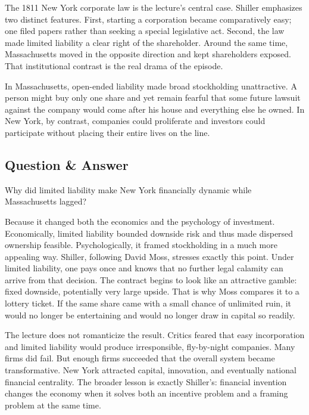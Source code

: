 The 1811 New York corporate law is the lecture's central case. Shiller emphasizes two distinct features. First, starting a corporation became comparatively easy; one filed papers rather than seeking a special legislative act. Second, the law made limited liability a clear right of the shareholder. Around the same time, Massachusetts moved in the opposite direction and kept shareholders exposed. That institutional contrast is the real drama of the episode.

In Massachusetts, open-ended liability made broad stockholding unattractive. A person might buy only one share and yet remain fearful that some future lawsuit against the company would come after his house and everything else he owned. In New York, by contrast, companies could proliferate and investors could participate without placing their entire lives on the line.

\subsection{Question \& Answer}

Why did limited liability make New York financially dynamic while Massachusetts lagged?

Because it changed both the economics and the psychology of investment. Economically, limited liability bounded downside risk and thus made dispersed ownership feasible. Psychologically, it framed stockholding in a much more appealing way. Shiller, following David Moss, stresses exactly this point. Under limited liability, one pays once and knows that no further legal calamity can arrive from that decision. The contract begins to look like an attractive gamble: fixed downside, potentially very large upside. That is why Moss compares it to a lottery ticket. If the same share came with a small chance of unlimited ruin, it would no longer be entertaining and would no longer draw in capital so readily.

The lecture does not romanticize the result. Critics feared that easy incorporation and limited liability would produce irresponsible, fly-by-night companies. Many firms did fail. But enough firms succeeded that the overall system became transformative. New York attracted capital, innovation, and eventually national financial centrality. The broader lesson is exactly Shiller's: financial invention changes the economy when it solves both an incentive problem and a framing problem at the same time.

